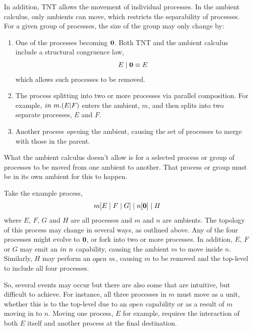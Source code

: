 In addition, TNT allows the movement of individual processes.  In the
ambient calculus, only ambients can move, which restricts the
separability of processes.  For a given group of processes, the
size of the group may only change by:

\begin{enumerate}
\item One of the processes becoming $\textbf{0}$.  Both TNT and the ambient
      calculus include a structural congruence law,
\begin{equation}
E\;|\;\textbf{0} \equiv E
\end{equation}
      which allows such processes to be removed.
\item The process splitting into two or more processes via parallel
      composition.  For example, $in\ m.(E | F)$ enters the ambient, $m$,
      and then splits into two separate processes, $E$ and $F$.
\item Another process \emph{open}ing the ambient, causing the set of
      processes to merge with those in the parent.
\end{enumerate}

What the ambient calculus doesn't allow is for a selected process or
group of processes to be moved from one ambient to another.  That
process or group must be in its own ambient for this to happen.

Take the example process, 
\begin{equation}
m[E\;|\;F\;|\;G]\;|\;n[\textbf{0}]\;|\;H
\end{equation}
where $E$, $F$, $G$ and $H$ are all processes and $m$ and $n$
are ambients.  The topology of this process may change in several ways, as
outlined above. Any of the four processes might evolve to $\textbf{0}$, or fork
into two or more processes.  In addition, $E$, $F$ or $G$ may emit an
$in\ n$ capability, causing the ambient $m$ to move inside $n$.
Similarly, $H$ may perform an $open\ m$, causing $m$ to be removed and
the top-level to include all four processes.

So, several events may occur but there are also some that are intuitive,
but difficult to achieve.  For instance, all three processes in $m$ must
move as a unit, whether this is to the top-level due to an $open$
capability or as a result of $m$ moving in to $n$.  Moving one process,
$E$ for example, requires the interaction of both $E$ itself and another
process at the final destination.

